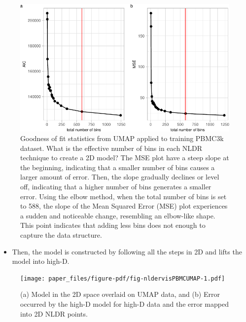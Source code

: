 \documentclass[
  12pt]{article}
\providecommand{\tightlist}{%
  \setlength{\itemsep}{0pt}\setlength{\parskip}{0pt}}\usepackage{longtable,booktabs,array}
\begin{document}
\begin{figure}

{\centering \includegraphics{paper_files/figure-pdf/fig-diagnosticpltPBMC-1.pdf}

}

\caption{\label{fig-diagnosticpltPBMC}Goodness of fit statistics from
UMAP applied to training PBMC3k dataset. What is the effective number of
bins in each NLDR technique to create a 2D model? The MSE plot have a
steep slope at the beginning, indicating that a smaller number of bins
causes a larger amount of error. Then, the slope gradually declines or
level off, indicating that a higher number of bins generates a smaller
error. Using the elbow method, when the total number of bins is set to
588, the slope of the Mean Squared Error (MSE) plot experiences a sudden
and noticeable change, resembling an elbow-like shape. This point
indicates that adding less bins does not enough to capture the data
structure.}

\end{figure}

\begin{itemize}
\tightlist
\item
  Then, the model is constructed by following all the steps in 2D and
  lifts the model into high-D.
\end{itemize}

\begin{figure}[H]

{\centering \texttt{[image: paper\_files/figure-pdf/fig-nldervisPBMCUMAP-1.pdf]}

}

\caption{\label{fig-nldervisPBMCUMAP}(a) Model in the 2D space overlaid
on UMAP data, and (b) Error occurred by the high-D model for high-D data
and the error mapped into 2D NLDR points.}

\end{figure}
\end{document}
